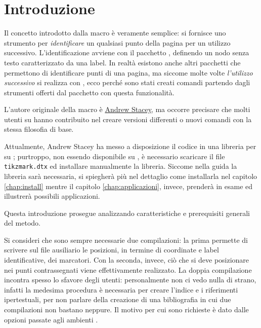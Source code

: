 \chapter{Introduzione}
Il concetto introdotto dalla  macro è veramente semplice: si fornisce uno strumento per \emph{identificare} un qualsiasi punto della pagina per un utilizzo successivo. L'identificazione avviene con il pacchetto \Tikz{}, definendo un nodo senza testo caratterizzato da una label. In realtà esistono anche altri pacchetti che permettono di identificare punti di una pagina, ma siccome molte volte \emph{l'utilizzo successivo} si realizza con \Tikz{}, ecco perché sono stati creati comandi partendo dagli strumenti offerti dal pacchetto con questa funzionalità.

L'autore originale della  macro è \href{http://tex.stackexchange.com/users/86/andrew-stacey}{Andrew Stacey}, ma occorre precisare che molti utenti su  hanno contribuito nel creare versioni differenti o nuovi comandi con la stessa filosofia di base.

Attualmente, Andrew Stacey ha messo a disposizione il codice in una libreria per \Tikz{} su ; purtroppo, non essendo disponibile su , è necessario scaricare il file \texttt{tikzmark.dtx} ed installare manualmente la libreria. Siccome nella guida la libreria sarà necessaria, si spiegherà più nel dettaglio come installarla nel capitolo \ref{chap:install} mentre il capitolo \ref{chap:applicazioni}, invece, prenderà in esame ed illustrerà possibili applicazioni.

Questa introduzione prosegue analizzando caratteristiche e prerequisiti generali del metodo. 

Si consideri che sono sempre necessarie due compilazioni: la prima permette di scrivere sul file ausiliario le posizioni, in termine di coordinate e label identificative, dei marcatori. Con la seconda, invece, ciò che si deve posizionare nei punti contrassegnati viene effettivamente realizzato. La doppia compilazione incontra spesso lo sfavore degli utenti: personalmente non ci vedo nulla di strano, infatti la medesima procedura è necessaria per creare l'indice e i riferimenti ipertestuali, per non parlare della creazione di una bibliografia in cui due compilazioni non bastano neppure. Il motivo per cui sono richieste è dato dalle opzioni  passate agli ambienti .

